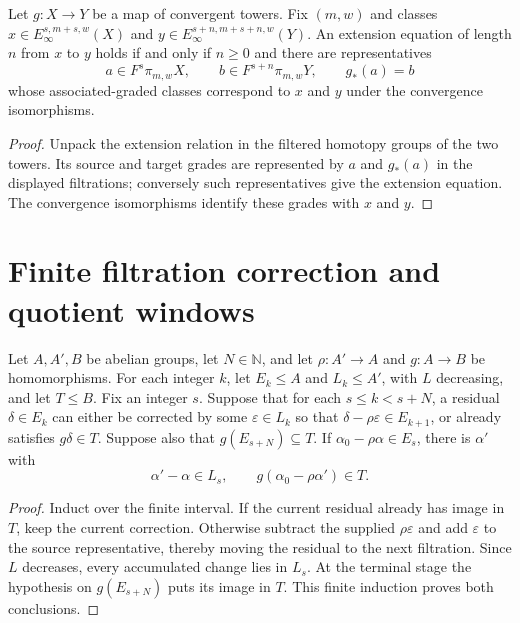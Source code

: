 \begin{theorem}
\label{sem:ProofTools:extension-representatives}
Let $g:X\to Y$ be a map of convergent towers. Fix $(m,w)$ and classes $x\in E_\infty^{s,m+s,w}(X)$ and $y\in E_\infty^{s+n,m+s+n,w}(Y)$. An extension equation of length $n$ from $x$ to $y$ holds if and only if $n\geq0$ and there are representatives
\[a\in F^s\pi_{m,w}X,\qquad b\in F^{s+n}\pi_{m,w}Y,\qquad g_*(a)=b\]
whose associated-graded classes correspond to $x$ and $y$ under the convergence isomorphisms.
\end{theorem}
\begin{proof}
Unpack the extension relation in the filtered homotopy groups of the two towers. Its source and target grades are represented by $a$ and $g_*(a)$ in the displayed filtrations; conversely such representatives give the extension equation. The convergence isomorphisms identify these grades with $x$ and $y$.
\end{proof}

\section{Finite filtration correction and quotient windows}

\begin{theorem}
\label{sem:ProofTools:finite-correction}
Let $A,A',B$ be abelian groups, let $N\in\mathbb N$, and let
$\rho:A'\to A$ and $g:A\to B$ be homomorphisms. For each integer $k$,
let $E_k\leq A$ and $L_k\leq A'$, with $L$ decreasing, and let
$T\leq B$. Fix an integer $s$. Suppose that for each $s\leq k<s+N$, a residual $\delta\in E_k$ can either be corrected by some $\varepsilon\in L_k$ so that $\delta-\rho\varepsilon\in E_{k+1}$, or already satisfies $g\delta\in T$. Suppose also that $g(E_{s+N})\subseteq T$. If $\alpha_0-\rho\alpha\in E_s$, there is $\alpha'$ with
\[\alpha'-\alpha\in L_s,\qquad g(\alpha_0-\rho\alpha')\in T.\]
\end{theorem}
\begin{proof}
Induct over the finite interval. If the current residual already has image in $T$, keep the current correction. Otherwise subtract the supplied $\rho\varepsilon$ and add $\varepsilon$ to the source representative, thereby moving the residual to the next filtration. Since $L$ decreases, every accumulated change lies in $L_s$. At the terminal stage the hypothesis on $g(E_{s+N})$ puts its image in $T$. This finite induction proves both conclusions.
\end{proof}


